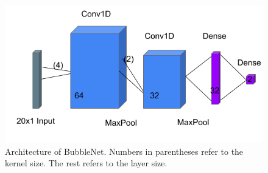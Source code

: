 		\begin{figure}
			\centering
			\includegraphics[scale=0.5]{images/cnn_architecture.png}
			\caption{Architecture of BubbleNet. Numbers in parentheses refer to the kernel size. The rest refers to the layer size. }
			\label{fig:cnn_arch}
			
%
%		
%		
%
%
		\end{figure}
		
